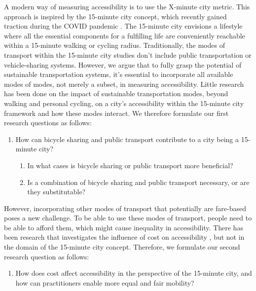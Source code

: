 A modern way of measuring accessibility is to use the X-minute city metric.
This approach is inspired by the 15-minute city concept, which recently gained traction during the COVID pandemic .
The 15-minute city envisions a lifestyle where all the essential components for a fulfilling life are conveniently reachable within a 15-minute walking or cycling radius.
Traditionally, the modes of transport within the 15-minute city studies don't include public transportation or vehicle-sharing systems.
However, we argue that to fully grasp the potential of sustainable transportation systems, it's essential to incorporate all available modes of modes, not merely a subset, in measuring accessibility.
Little research has been done on the impact of sustainable transportation modes, beyond walking and personal cycling, on a city's accessibility within the 15-minute city framework and how these modes interact.
We therefore formulate our first research questions as follows:

\begin{enumerate}
  \renewcommand{\labelenumi}{RQ \theenumi.}
  \item How can bicycle sharing and public transport contribute to a city being a 15-minute city?
  \label{rq:bicycle_pt}
  \begin{enumerate}
    \item In what cases is bicycle sharing or public transport more beneficial?
    \item Is a combination of bicycle sharing and public transport necessary, or are they substitutable?
  \end{enumerate}
\end{enumerate}

However, incorporating other modes of transport that potentially are fare-based poses a new challenge.
To be able to use these modes of transport, people need to be able to afford them, which might cause inequality in accessibility.
There has been research that investigates the influence of cost on accessibility , but not in the domain of the 15-minute city concept.
Therefore, we formulate our second research question as follows:

\begin{enumerate}
  \renewcommand{\labelenumi}{RQ \theenumi.}
  \setcounter{enumi}{1}
  \item How does cost affect accessibility in the perspective of the 15-minute city, and how can practitioners enable more equal and fair mobility?
  \label{rq:cost_accessibility}
\end{enumerate}

